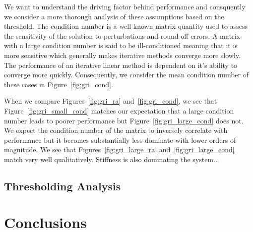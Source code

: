 \documentclass{article}
\newcommand{\sectionOne}[1]{\section{#1} \addvspace{10pt}}
\newcommand{\sectionTwo}[1]{\subsection{#1} \addvspace{10pt}}
\begin{document}
We want to understand the driving factor behind performance and consquently we consider a more thorough analysis of these assumptions based on the threshold.
The condition number is a well-known matrix quantity used to assess the sensitivity of the solution to perturbations and round-off errors\cite{trefethen1997numerical}.
A matrix with a large condition number is said to be ill-conditioned meaning that it is more sensitive which generally makes iterative methods converge more slowly.
The performance of an iterative linear method is dependent on it's ability to converge more quickly.
Consequently, we consider the mean condition number of these cases in Figure~\ref{fig:gri_cond}.


When we compare Figures~\ref{fig:gri_ra} and~\ref{fig:gri_cond}, we see that Figure~\ref{fig:gri_small_cond} matches our expectation that a large condition number leads to poorer performance but Figure~\ref{fig:gri_large_cond} does not.
We expect the condition number of the matrix to inversely correlate with performance but it becomes substantially less dominate with lower orders of magnitude.
We see that Figures~\ref{fig:gri_large_ra} and~\ref{fig:gri_large_cond} match very well qualitatively.
Stiffness is also dominating the system...


\sectionTwo{Thresholding Analysis}

\sectionOne{Conclusions}

\printbibliography
\end{document}
